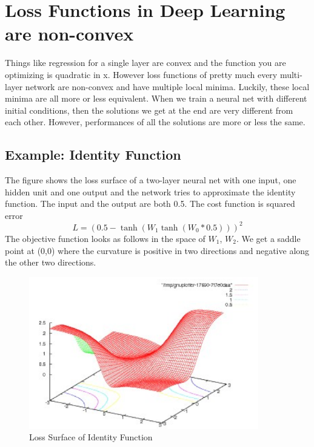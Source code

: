 \chapter{Loss Functions in Deep Learning are non-convex}\label{chp:Loss Functions in Deep Learning are non-convex}

Things like regression for a single layer are convex and the function you are optimizing is quadratic in x. However
loss functions of pretty much every multi-layer network are non-convex and have multiple local minima.
Luckily, these local minima are all more or less equivalent. 
When we train a neural net with different initial conditions, then the solutions we get at the end are very different from each other. 
However, performances of all the solutions are more or less the same. 

\section{Example: Identity Function}
The figure shows the loss surface of a two-layer neural net with one input, one hidden unit and one output and the network tries to approximate the identity function. 
The input and the output are both 0.5. The cost function is squared error 
\begin{equation}
    L = (0.5 - \tanh (W_1 \tanh (W_0 * 0.5)))^2
\end{equation}
The objective function looks as follows in the space of $W_1$, $W_2$. 
We get a saddle point at (0,0) where the curvature is positive in two directions and negative along the other two directions.\\

\begin{figure}[ht]
\centering
\includegraphics[width=100mm]{figs/Identity.PNG}
\caption{Loss Surface of Identity Function}
\label{fig:idfn}
\end{figure}

